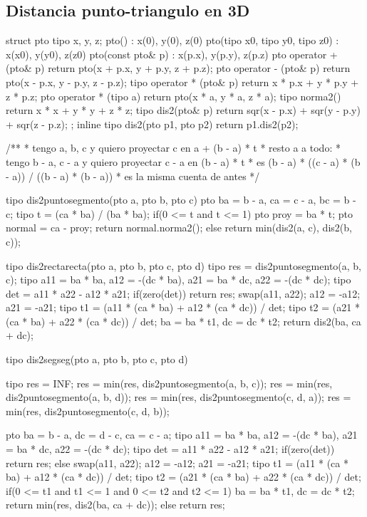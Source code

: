 \documentclass[10pt,landscape,twocolumn,a4paper,notitlepage]{article}
\begin{document}
\subsection{Distancia punto-triangulo en 3D}
\begin{code}
struct pto {
    tipo x, y, z;
    pto() : x(0), y(0), z(0) {}
    pto(tipo x0, tipo y0, tipo z0) : x(x0), y(y0), z(z0) {}
    pto(const pto& p) : x(p.x), y(p.y), z(p.z) {}
    pto operator + (pto& p) { return pto(x + p.x, y + p.y, z + p.z); }
    pto operator - (pto& p) { return pto(x - p.x, y - p.y, z - p.z); }
    tipo operator * (pto& p) { return x * p.x + y * p.y + z * p.z; }
    pto operator * (tipo a) { return pto(x * a, y * a, z * a); }
    tipo norma2() { return x * x + y * y + z * z; }
    tipo dis2(pto& p) { return sqr(x - p.x) + sqr(y - p.y) + sqr(z - p.z); }
};
inline tipo dis2(pto p1, pto p2){ return p1.dis2(p2); }

/**
 * tengo a, b, c y quiero proyectar c en a + (b - a) * t
 * resto a a todo:
 * tengo b - a, c - a y quiero proyectar c - a en (b - a) * t
 * es (b - a) * ((c - a) * (b - a)) / ((b - a) * (b - a))
 * es la misma cuenta de antes
 */

tipo dis2puntosegmento(pto a, pto b, pto c) {
    pto ba = b - a, ca = c - a, bc = b - c;
    tipo t = (ca * ba) / (ba * ba);
    if(0 <= t and t <= 1) {
        pto proy = ba * t;
        pto normal = ca - proy;
        return normal.norma2();
    }
    else return min(dis2(a, c), dis2(b, c));
}

tipo dis2rectarecta(pto a, pto b, pto c, pto d) {
    tipo res = dis2puntosegmento(a, b, c);
    tipo a11 = ba * ba, a12 = -(dc * ba), a21 = ba * dc, a22 = -(dc * dc);
    tipo det = a11 * a22 - a12 * a21;
    if(zero(det)) return res;
    swap(a11, a22); a12 = -a12; a21 = -a21;
    tipo t1 = (a11 * (ca * ba) + a12 * (ca * dc)) / det;
    tipo t2 = (a21 * (ca * ba) + a22 * (ca * dc)) / det;
    ba = ba * t1, dc = dc * t2;
    return dis2(ba, ca + dc);
}

tipo dis2segseg(pto a, pto b, pto c, pto d) {
    tipo res = INF;
    res = min(res, dis2puntosegmento(a, b, c));
    res = min(res, dis2puntosegmento(a, b, d));
    res = min(res, dis2puntosegmento(c, d, a));
    res = min(res, dis2puntosegmento(c, d, b));
    
    pto ba = b - a, dc = d - c, ca = c - a;
    tipo a11 = ba * ba, a12 = -(dc * ba), a21 = ba * dc, a22 = -(dc * dc);
    tipo det = a11 * a22 - a12 * a21;
    if(zero(det)) return res;
    else {
        swap(a11, a22); a12 = -a12; a21 = -a21;
        tipo t1 = (a11 * (ca * ba) + a12 * (ca * dc)) / det;
        tipo t2 = (a21 * (ca * ba) + a22 * (ca * dc)) / det;
        if(0 <= t1 and t1 <= 1 and 0 <= t2 and t2 <= 1) {
            ba = ba * t1, dc = dc * t2;
            return min(res, dis2(ba, ca + dc));
        }
        else return res;
    }
}


\end{code}
\end{document}
